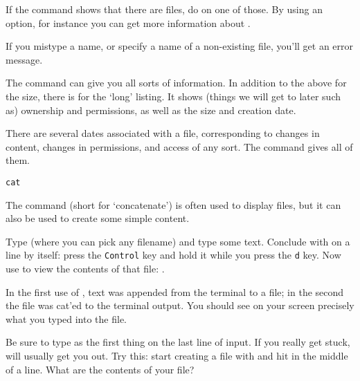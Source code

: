\begin{exercise}
  If the  command shows that there are files, do
   on one of those.
  By using an option, for instance 
  you can get more information about .
\end{exercise}

\begin{caution}
  If you mistype a name, or specify a name of a
  non-existing file, you'll get an error message.
\end{caution}

The  command can give you all sorts of information.
In addition to the above  for the size, there is
 for the `long' listing.
It shows (things we will get to later such as) ownership and permissions,
as well as the size and creation date.

\begin{remark}
  There are several dates associated with a file, corresponding to
  changes in content, changes in permissions, and access of any
  sort. The  command gives all of them.
\end{remark}

 {\texttt{cat}}

The  command (short for `concatenate')
is often used to display files, but it can also be
used to create some simple content. 

\begin{exercise}
  Type  (where you can pick any filename) and
  type some text. Conclude with  on a line by
  itself: press the \texttt{Control} key and hold it while you
  press the \texttt{d} key.  Now use  to view the
  contents of that file: .
\end{exercise}
\begin{outcome}
  In the first use of , text was appended
  from the terminal to a file; in the second the file was cat'ed to
  the terminal output. You should see on your screen precisely what
  you typed into the file.
\end{outcome}
\begin{caution}
  Be sure to type  as the first thing on the last line of input. If you
    really get stuck,  will usually get you out. Try this:
    start creating a file with  and hit  in
    the middle of a line. What are the contents of your file?
\end{caution}

